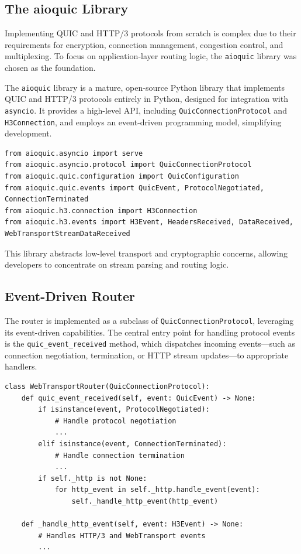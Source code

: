 \subsection{The aioquic Library}
Implementing QUIC and HTTP/3 protocols from scratch is complex due to their requirements for encryption, connection management, congestion control, and multiplexing. To focus on application-layer routing logic, the \texttt{aioquic} library was chosen as the foundation.

The \texttt{aioquic} library \cite{aioquic-repo} is a mature, open-source Python \cite{python-docs} library that implements QUIC and HTTP/3 protocols entirely in Python, designed for integration with \texttt{asyncio}. It provides a high-level API, including \texttt{QuicConnectionProtocol} and \texttt{H3Connection}, and employs an event-driven programming model, simplifying development.

\begin{lstlisting}[breaklines=true,basicstyle=\small\ttfamily,frame=single]
from aioquic.asyncio import serve
from aioquic.asyncio.protocol import QuicConnectionProtocol
from aioquic.quic.configuration import QuicConfiguration
from aioquic.quic.events import QuicEvent, ProtocolNegotiated, ConnectionTerminated
from aioquic.h3.connection import H3Connection
from aioquic.h3.events import H3Event, HeadersReceived, DataReceived, WebTransportStreamDataReceived
\end{lstlisting}

This library abstracts low-level transport and cryptographic concerns, allowing developers to concentrate on stream parsing and routing logic.

\subsection{Event-Driven Router}
The router is implemented as a subclass of \texttt{QuicConnectionProtocol}, leveraging its event-driven capabilities. The central entry point for handling protocol events is the \texttt{quic\_event\_received} method, which dispatches incoming events—such as connection negotiation, termination, or HTTP stream updates—to appropriate handlers.

\begin{lstlisting}[breaklines=true,basicstyle=\small\ttfamily,frame=single]
class WebTransportRouter(QuicConnectionProtocol):
    def quic_event_received(self, event: QuicEvent) -> None:
        if isinstance(event, ProtocolNegotiated):
            # Handle protocol negotiation
            ...
        elif isinstance(event, ConnectionTerminated):
            # Handle connection termination
            ...
        if self._http is not None:
            for http_event in self._http.handle_event(event):
                self._handle_http_event(http_event)

    def _handle_http_event(self, event: H3Event) -> None:
        # Handles HTTP/3 and WebTransport events
        ...
\end{lstlisting}

